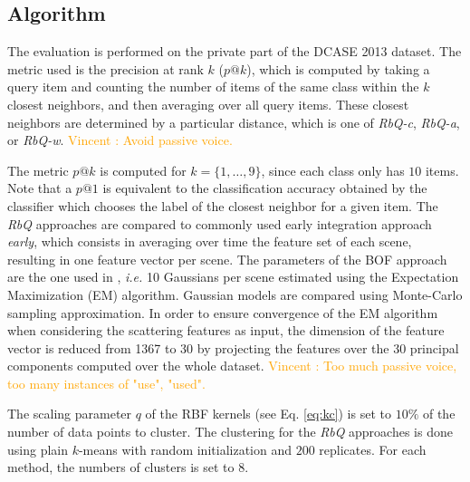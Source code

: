 \documentclass[smallextended]{svjour3}
\newcommand{\vl}[1]{\textcolor{orange}{Vincent : #1}}
\newcommand{\ja}[1]{\textcolor{magenta}{Joakim : #1}}
\newcommand{\ml}[1]{\textcolor{blue}{ Mathieu : #1}}
\begin{document}


\subsection{Algorithm}

The evaluation is performed on the private part of the DCASE 2013 dataset. The metric used is the precision at rank $k$ ($p@k$), which is computed by taking a query item and counting the number of items of the same class within the $k$ closest neighbors, and then averaging over all query items. These closest neighbors are determined by a particular distance, which is one of \emph{RbQ-c}, \emph{RbQ-a}, or \emph{RbQ-w}. \vl{Avoid passive voice.}

The metric $p@k$ is computed for $k=\lbrace 1,\ldots,9\rbrace$, since each class only has $10$ items. Note that a $p@1$ is equivalent to the classification accuracy obtained by the classifier which chooses the label of the closest neighbor for a given item. The \emph{RbQ} approaches are compared to commonly used early integration approach \emph{early}, which consists in averaging over time the feature set of each scene, resulting in one feature vector per scene. The parameters of the BOF approach are the one used in \cite{aucouturier2007bag}, \textit{i.e.} 10 Gaussians per scene estimated using the Expectation Maximization (EM) algorithm. Gaussian models are compared using Monte-Carlo sampling approximation. In order to ensure convergence of the EM algorithm when considering the scattering features as input, the dimension of the feature vector is reduced from 1367 to 30 by projecting the features over the 30 principal components computed over the whole dataset. \vl{Too much passive voice, too many instances of "use", "used".}

The scaling parameter $q$ of the RBF kernels (see Eq. \ref{eq:kc}) is set to $10\%$ of the number of data points to cluster.%
The clustering for the \emph{RbQ} approaches is done using plain $k$-means with random initialization and $200$ replicates. For each method, the numbers of clusters is set to $8$.
\end{document}
